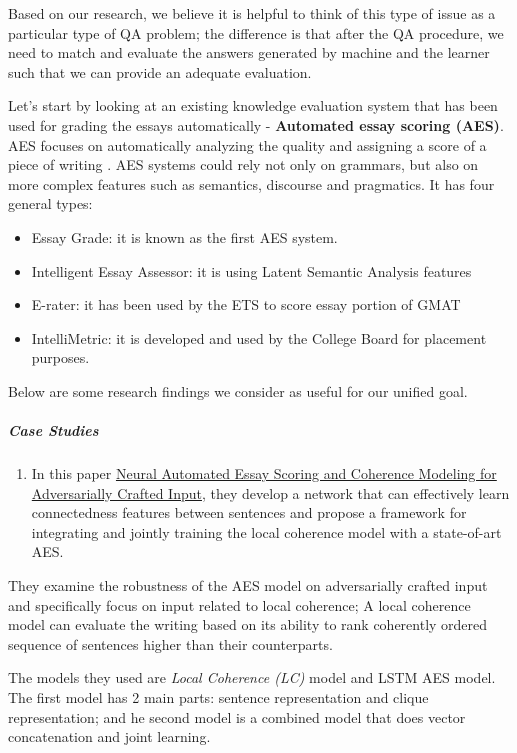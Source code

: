 \documentclass{acm_proc_article-sp}
\providecommand{\tightlist}{%
  \setlength{\itemsep}{0pt}\setlength{\parskip}{0pt}}
\begin{document}
Based on our research, we believe it is helpful to think of this type of
issue as a particular type of QA problem; the difference is that after
the QA procedure, we need to match and evaluate the answers generated by
machine and the learner such that we can provide an adequate evaluation.

Let's start by looking at an existing knowledge evaluation system that
has been used for grading the essays automatically - \textbf{Automated
essay scoring (AES)}. AES focuses on automatically analyzing the quality
and assigning a score of a piece of writing . AES systems could rely not
only on grammars, but also on more complex features such as semantics,
discourse and pragmatics. It has four general types:

\begin{itemize}
\item
  Essay Grade: it is known as the first AES system.
\item
  Intelligent Essay Assessor: it is using Latent Semantic Analysis
  features
\item
  E-rater: it has been used by the ETS to score essay portion of GMAT
\item
  IntelliMetric: it is developed and used by the College Board for
  placement purposes.
\end{itemize}

Below are some research findings we consider as useful for our unified
goal.

\subparagraph{Case Studies}\label{case-studies-3}

\begin{enumerate}
\def\labelenumi{\arabic{enumi}.}
\tightlist
\item
  In this paper \href{http://aclweb.org/anthology/N18-1024}{Neural
  Automated Essay Scoring and Coherence Modeling for Adversarially
  Crafted Input}, they develop a network that can effectively learn
  connectedness features between sentences and propose a framework for
  integrating and jointly training the local coherence model with a
  state-of-art AES.
\end{enumerate}

They examine the robustness of the AES model on adversarially crafted
input and specifically focus on input related to local coherence; A
local coherence model can evaluate the writing based on its ability to
rank coherently ordered sequence of sentences higher than their
counterparts.

The models they used are \emph{Local Coherence (LC)} model and LSTM AES
model. The first model has 2 main parts: sentence representation and
clique representation; and he second model is a combined model that does
vector concatenation and joint learning.
\end{document}
